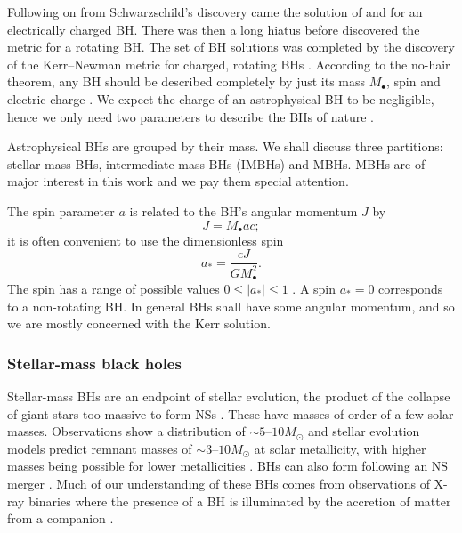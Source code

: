 Following on from Schwarzschild's discovery came the solution of \citet{Reissner1916} and \citet{Nordstrom1918} for an electrically charged BH. There was then a long hiatus before \citet{Kerr1963} discovered the metric for a rotating BH. The set of BH solutions was completed by the discovery of the Kerr--Newman metric for charged, rotating BHs \citep{Newman1965}. According to the no-hair theorem, any BH should be described completely by just its mass $M_\bullet$, spin and electric charge \citep{Israel1967, Israel1968, Carter1971, Hawking1972, Robinson1975}. We expect the charge of an astrophysical BH to be negligible, hence we only need two parameters to describe the BHs of nature \citep[sections 36, 51]{Chandrasekhar1992}.

Astrophysical BHs are grouped by their mass. We shall discuss three partitions: stellar-mass BHs, intermediate-mass BHs (IMBHs) and MBHs. MBHs are of major interest in this work and we pay them special attention.

The spin parameter $a$ is related to the BH's angular momentum $J$ by
\begin{equation}
J = M_\bullet ac;
\end{equation}
it is often convenient to use the dimensionless spin
\begin{equation}
a_\ast = \dfrac{cJ}{GM_\bullet^2}.
\end{equation}
The spin has a range of possible values $0 \leq |a_\ast| \leq 1$ \cite[section 66]{Chandrasekhar1992}. A spin $a_\ast = 0$ corresponds to a non-rotating BH. In general BHs shall have some angular momentum, and so we are mostly concerned with the Kerr solution.

\subsubsection{Stellar-mass black holes}

Stellar-mass BHs are an endpoint of stellar evolution, the product of the collapse of giant stars too massive to form NSs \citep{Postnov2006}. These have masses of order of a few solar masses. Observations show a distribution of $\sim5$--$10M_\odot$ \citep{Ozel2010,Farr2010} and stellar evolution models predict remnant masses of $\sim3$--$10M_\odot$ at solar metallicity, with higher masses being possible for lower metallicities \citep{Woosley2002}. BHs can also form following an NS merger \citep{Rezzolla2011,Faber2012}. Much of our understanding of these BHs comes from observations of X-ray binaries where the presence of a BH is illuminated by the accretion of matter from a companion \citep{Shakura1973,Remillard2006}.

